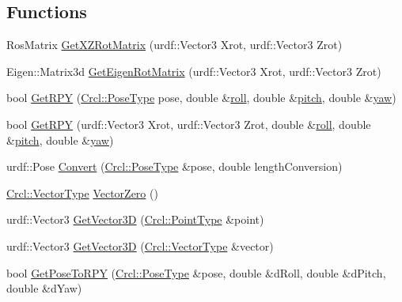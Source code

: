 \subsection*{Functions}
\begin{DoxyCompactItemize}
\item 
Ros\-Matrix \hyperlink{namespaceCrcl_a7851c914ebfcd66dd694dbfb58f19d3f}{Get\-X\-Z\-Rot\-Matrix} (urdf\-::\-Vector3 Xrot, urdf\-::\-Vector3 Zrot)
\item 
Eigen\-::\-Matrix3d \hyperlink{namespaceCrcl_ae23e722dceffa52b05402c3f557c9e65}{Get\-Eigen\-Rot\-Matrix} (urdf\-::\-Vector3 Xrot, urdf\-::\-Vector3 Zrot)
\item 
bool \hyperlink{namespaceCrcl_aae1ccbac42b6e192b3ed46578e3a7b71}{Get\-R\-P\-Y} (\hyperlink{namespaceCrcl_acc6c82b52280f4d0e74b82a92400956e}{Crcl\-::\-Pose\-Type} pose, double \&\hyperlink{SanityCheckTests_8cpp_a1d3228afa3a1d6773954f40c1e519eb9}{roll}, double \&\hyperlink{SanityCheckTests_8cpp_a34c057a0378030db67bd6a129f37d938}{pitch}, double \&\hyperlink{SanityCheckTests_8cpp_a21cd490f6191f66678f55b4c242a10cf}{yaw})
\item 
bool \hyperlink{namespaceCrcl_a11e5c6625b133a0ad8d38bef745d5bf6}{Get\-R\-P\-Y} (urdf\-::\-Vector3 Xrot, urdf\-::\-Vector3 Zrot, double \&\hyperlink{SanityCheckTests_8cpp_a1d3228afa3a1d6773954f40c1e519eb9}{roll}, double \&\hyperlink{SanityCheckTests_8cpp_a34c057a0378030db67bd6a129f37d938}{pitch}, double \&\hyperlink{SanityCheckTests_8cpp_a21cd490f6191f66678f55b4c242a10cf}{yaw})
\item 
urdf\-::\-Pose \hyperlink{namespaceCrcl_a6ba76fbe3bb36cef5f8a289c327e7a4b}{Convert} (\hyperlink{namespaceCrcl_acc6c82b52280f4d0e74b82a92400956e}{Crcl\-::\-Pose\-Type} \&pose, double length\-Conversion)
\item 
\hyperlink{namespaceCrcl_ae868d4ece511d1485ed5d9118395aef8}{Crcl\-::\-Vector\-Type} \hyperlink{namespaceCrcl_add9e9e39ef44f31dae46c86a85201726}{Vector\-Zero} ()
\item 
urdf\-::\-Vector3 \hyperlink{namespaceCrcl_aa4478a87fcc970adc728f4fbb275b8f3}{Get\-Vector3\-D} (\hyperlink{namespaceCrcl_a04f09d617642257f5938e52cee2feeef}{Crcl\-::\-Point\-Type} \&point)
\item 
urdf\-::\-Vector3 \hyperlink{namespaceCrcl_a1d76629ad554e6d08322a36fbafcbc5a}{Get\-Vector3\-D} (\hyperlink{namespaceCrcl_ae868d4ece511d1485ed5d9118395aef8}{Crcl\-::\-Vector\-Type} \&vector)
\item 
bool \hyperlink{namespaceCrcl_a394a527b4609a6d5b444f30bb9384f1a}{Get\-Pose\-To\-R\-P\-Y} (\hyperlink{namespaceCrcl_acc6c82b52280f4d0e74b82a92400956e}{Crcl\-::\-Pose\-Type} \&pose, double \&d\-Roll, double \&d\-Pitch, double \&d\-Yaw)

\end{DoxyCompactItemize}
